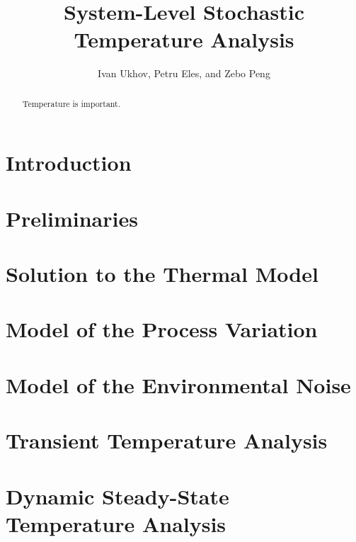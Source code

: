 \documentclass[conference]{IEEEtran}
\begin{document}
  \title{System-Level Stochastic Temperature Analysis}
  \author{Ivan Ukhov, Petru Eles, and Zebo Peng}

  \maketitle

  \begin{abstract}
    Temperature is important.
  \end{abstract}

  \section{Introduction}  
  

  \section{Preliminaries}
  

  \section{Solution to the Thermal Model} 
  

  \section{Model of the Process Variation} 
  

  \section{Model of the Environmental Noise} 
  


  \section{Transient Temperature Analysis} 
  

  \section{Dynamic Steady-State Temperature Analysis} 
  

  
  
\end{document}
